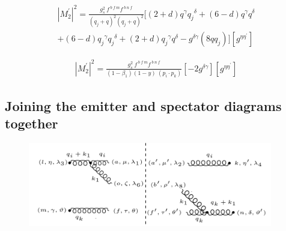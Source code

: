 \begin{equation}
\begin{split}
{|{M}^{\prime}_2|}^2 =\frac{g_s^2\: f^{\:b\:f\:m} f^{\:b\:n\:f}}{(q_j +q)^2 (q_j +q)^2}[(2+d)q^{\gamma}{q_j}^{\delta}+(6-d)q^{\gamma}{q}^{\delta}\\+(6-d){q_j}^{\gamma}{q_j}^{\delta}+(2+d){q_j}^{\gamma}{q}^{\delta}-g^{{\delta}{\gamma}}(8qq_j)][g^{{\eta}{{\eta}^{\prime}}}]
\end{split}
\end{equation}
%
%

\begin{equation}
\begin{split}
{|{M}^{\prime}_2|}^2 =\frac{g_s^2\: f^{\:b\:f\:m} f^{\:b\:n\:f}}{(1-\beta_1) (1-y)\:(p_i \cdot p_k)}[-2g^{{\delta}{\gamma}}][g^{{\eta}{{\eta}^{\prime}}}]
\end{split}
\end{equation}
\pagebreak

\subsection{Joining the emitter and spectator diagrams together}
\begin{figure}[h!]
\centering
\includegraphics[width=0.95\textwidth]{images/GG/M1M2Dagger.png}
\end{figure}


